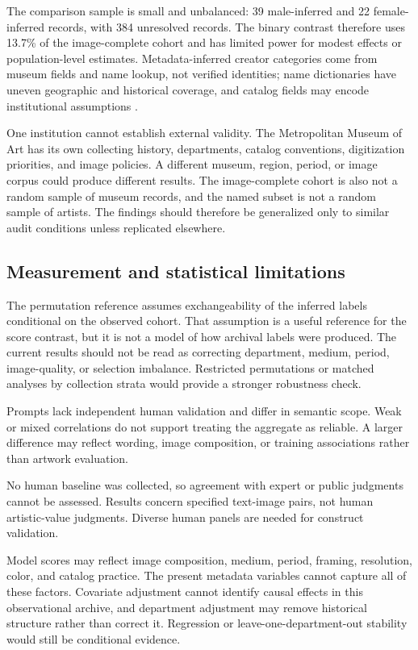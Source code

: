 \documentclass[pdflatex,sn-basic,Numbered]{sn-jnl}
\begin{document}
The comparison sample is small and unbalanced: 39 male-inferred and 22 female-inferred records, with 384 unresolved records. The binary contrast therefore uses 13.7\% of the image-complete cohort and has limited power for modest effects or population-level estimates. Metadata-inferred creator categories come from museum fields and name lookup, not verified identities; name dictionaries have uneven geographic and historical coverage, and catalog fields may encode institutional assumptions \cite{keyes2018misgendering, buolamwini2018gender}.

One institution cannot establish external validity. The Metropolitan Museum of Art has its own collecting history, departments, catalog conventions, digitization priorities, and image policies. A different museum, region, period, or image corpus could produce different results. The image-complete cohort is also not a random sample of museum records, and the named subset is not a random sample of artists. The findings should therefore be generalized only to similar audit conditions unless replicated elsewhere.

\subsection{Measurement and statistical limitations}
The permutation reference assumes exchangeability of the inferred labels conditional on the observed cohort. That assumption is a useful reference for the score contrast, but it is not a model of how archival labels were produced. The current results should not be read as correcting department, medium, period, image-quality, or selection imbalance. Restricted permutations or matched analyses by collection strata would provide a stronger robustness check.

Prompts lack independent human validation and differ in semantic scope. Weak or mixed correlations do not support treating the aggregate as reliable. A larger difference may reflect wording, image composition, or training associations rather than artwork evaluation.

No human baseline was collected, so agreement with expert or public judgments cannot be assessed. Results concern specified text-image pairs, not human artistic-value judgments. Diverse human panels are needed for construct validation.

Model scores may reflect image composition, medium, period, framing, resolution, color, and catalog practice. The present metadata variables cannot capture all of these factors. Covariate adjustment cannot identify causal effects in this observational archive, and department adjustment may remove historical structure rather than correct it. Regression or leave-one-department-out stability would still be conditional evidence.
\end{document}
